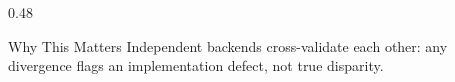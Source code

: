 \begin{frame}
\begin{columns}[T]
\begin{column}{0.48\textwidth}
      \vspace{0.1cm}
      \begin{card}{Why This Matters}
        \scriptsize Independent backends cross-validate each other: any divergence flags an implementation defect, not true disparity.
      \end{card}
    \end{column}
  \end{columns}
\end{frame}

